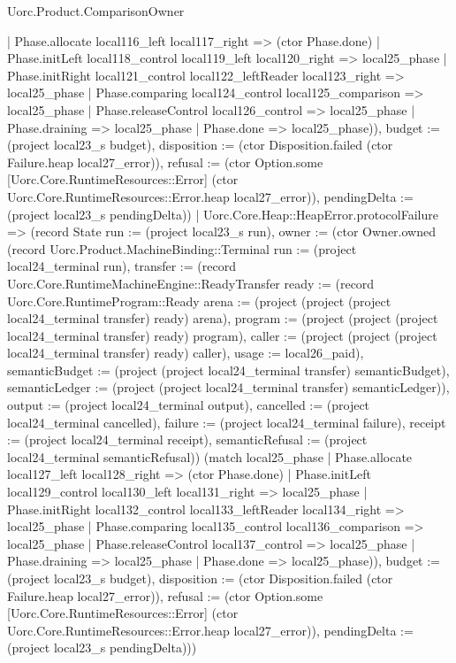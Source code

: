 \begin{lexlean}{Uorc.Product.ComparisonOwner}
\begin{semanticmodule}
{{      | Phase.allocate local116_left local117_right => (ctor Phase.done)
      | Phase.initLeft local118_control local119_left local120_right => local25_phase
      | Phase.initRight local121_control local122_leftReader local123_right => local25_phase
      | Phase.comparing local124_control local125_comparison => local25_phase
      | Phase.releaseControl local126_control => local25_phase
      | Phase.draining => local25_phase
      | Phase.done => local25_phase)), budget := (project local23_s budget), disposition := (ctor Disposition.failed (ctor Failure.heap local27_error)), refusal := (ctor Option.some [Uorc.Core.RuntimeResources::Error] (ctor Uorc.Core.RuntimeResources::Error.heap local27_error)), pendingDelta := (project local23_s pendingDelta)})
    | Uorc.Core.Heap::HeapError.protocolFailure => (record State {run := (project local23_s run), owner := (ctor Owner.owned (record Uorc.Product.MachineBinding::Terminal {run := (project local24_terminal run), transfer := (record Uorc.Core.RuntimeMachineEngine::ReadyTransfer {ready := (record Uorc.Core.RuntimeProgram::Ready {arena := (project (project (project local24_terminal transfer) ready) arena), program := (project (project (project local24_terminal transfer) ready) program), caller := (project (project (project local24_terminal transfer) ready) caller), usage := local26_paid}), semanticBudget := (project (project local24_terminal transfer) semanticBudget), semanticLedger := (project (project local24_terminal transfer) semanticLedger)}), output := (project local24_terminal output), cancelled := (project local24_terminal cancelled), failure := (project local24_terminal failure), receipt := (project local24_terminal receipt), semanticRefusal := (project local24_terminal semanticRefusal)}) (match local25_phase
      | Phase.allocate local127_left local128_right => (ctor Phase.done)
      | Phase.initLeft local129_control local130_left local131_right => local25_phase
      | Phase.initRight local132_control local133_leftReader local134_right => local25_phase
      | Phase.comparing local135_control local136_comparison => local25_phase
      | Phase.releaseControl local137_control => local25_phase
      | Phase.draining => local25_phase
      | Phase.done => local25_phase)), budget := (project local23_s budget), disposition := (ctor Disposition.failed (ctor Failure.heap local27_error)), refusal := (ctor Option.some [Uorc.Core.RuntimeResources::Error] (ctor Uorc.Core.RuntimeResources::Error.heap local27_error)), pendingDelta := (project local23_s pendingDelta)}))
}


\end{semanticmodule}
\end{lexlean}
